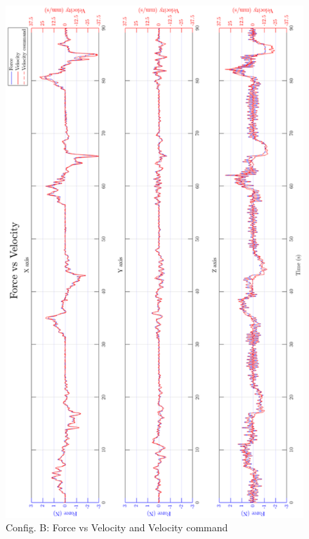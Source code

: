\begin{figure}[htbp]
\begin{center}
\includegraphics[width=0.9\linewidth]{Images/exp/exp1_2_2.png}
\caption{Config. B: Force vs Velocity and Velocity command}
\label{fig: exp1_2_2}
\end{center}
\end{figure}


